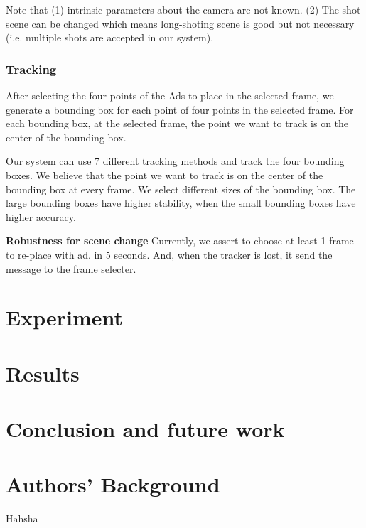 \documentclass{sig-alternate}
\begin{document}
Note that (1) intrinsic parameters about the camera are not known. (2) The shot scene can be changed which means long-shoting scene is good but not necessary (i.e. multiple shots are accepted in our system).

\subsubsection{Tracking}

After selecting the four points of the Ads to place in the selected frame, we generate a bounding box for each point of four points in the selected frame. For each bounding box, at the selected frame, the point we want to track is on the center of the bounding box. 


Our system can use 7 different tracking methods and track the four bounding boxes. 
We believe that the point we want to track is on the center of the bounding box at every frame. 
We select different sizes of the bounding box. The large bounding boxes have higher stability, when the small bounding boxes have higher accuracy. 



\textbf{Robustness for scene change} Currently, we assert to choose at least 1 frame to re-place with ad. in 5 seconds. 
And, when the tracker is lost, it send the message to the frame selecter. 


\section{Experiment}
\label{sec:expr}

\subsection{}

\section{Results}
\label{sec:result}
\section{Conclusion and future work}
\label{sec:future}





\newpage    
\section{Authors' Background}

Hahsha
\end{document}
